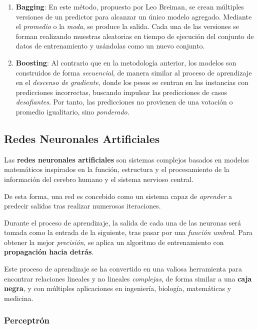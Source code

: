 \begin{enumerate}
    \item \textbf{Bagging}: En este método, propuesto por Leo Breiman\cite{Breiman1996BaggingPredictors}, se crean múltiples versiones de un predictor para alcanzar un único modelo agregado. Mediante el \textit{promedio} o la \textit{moda}, se produce la salida. Cada una de las versiones se forman realizando muestras aleatorias en tiempo de ejecución del conjunto de datos de entrenamiento y usándolas como un nuevo conjunto.
    \item \textbf{Boosting}: Al contrario que en la metodología anterior, los modelos son construidos de forma \textit{secuencial}, de manera similar al proceso de aprendizaje en el \textit{descenso de gradiente}, donde los pesos se centran en las instancias con predicciones incorrectas, buscando impulsar las predicciones de casos \textit{desafiantes}. Por tanto, las predicciones no provienen de una votación o promedio igualitario, sino \textit{ponderado}.
\end{enumerate}


\subsection{Redes Neuronales Artificiales}

Las \textbf{redes neuronales artificiales} son sistemas complejos basados en modelos matemáticos inspirados en la función, estructura y el procesamiento de la información del cerebro humano y el sistema nervioso central.\cite{Huang2022AutomaticNetworks}

De esta forma, una red es concebido como un sistema capaz de \textit{aprender} a predecir salidas tras realizar numerosas iteraciones.

Durante el proceso de aprendizaje, la salida de cada una de las neuronas será tomada como la entrada de la siguiente, tras pasar por una \textit{función umbral}. Para obtener la mejor \textit{precisión}, se aplica un algoritmo de entrenamiento con \textbf{propagación hacia detrás}.

Este proceso de aprendizaje se ha convertido en una valiosa herramienta para encontrar relaciones lineales y no lineales \textit{complejas}, de forma similar a una \textbf{caja negra}, y con múltiples aplicaciones en ingeniería, biología, matemáticas y medicina\cite{Moayedi2020AApplications}.

\subsubsection{Perceptrón}

